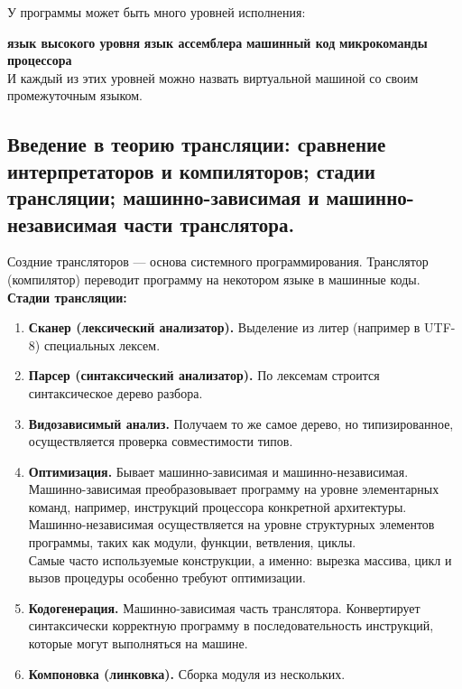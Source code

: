 \documentclass[12pt, a4paper]{article}
\begin{document}
У программы может быть много уровней исполнения:

\textbf{язык высокого уровня} \Longrightarrow{} \textbf{язык ассемблера} \Longrightarrow{} \textbf{машинный код} \Longrightarrow{} \textbf{микрокоманды процессора}\\

И каждый из этих уровней можно назвать виртуальной машиной со своим промежуточным языком. 

\subsection{Введение в теорию трансляции: сравнение интерпретаторов и компиляторов; стадии трансляции; машинно-зависимая и машинно-независимая части транслятора.}

Создние трансляторов --- основа системного программирования. Транслятор (компилятор) переводит программу на некотором языке в машинные коды.\\

\textbf{Стадии трансляции:}

\begin{enumerate}
    \item \textbf{Сканер (лексический анализатор).} Выделение из литер (например в UTF-8) специальных лексем.
    \item \textbf{Парсер (синтаксический анализатор).} По лексемам строится синтаксическое дерево разбора.
    \item \textbf{Видозависимый анализ.} Получаем то же самое дерево, но типизированное, осуществляется проверка совместимости типов.
    \item \textbf{Оптимизация.} Бывает машинно-зависимая и машинно-независимая. Машинно-зависимая преобразовывает программу на уровне элементарных команд, например, инструкций процессора конкретной архитектуры. Машинно-независимая осуществляется на уровне структурных элементов программы, таких как модули, функции, ветвления, циклы.\\
    Самые часто используемые конструкции, а именно: вырезка массива, цикл и вызов процедуры особенно требуют оптимизации. 
    \item \textbf{Кодогенерация.} Машинно-зависимая часть транслятора. Конвертирует синтаксически корректную программу в последовательность инструкций, которые могут выполняться на машине.
    \item \textbf{Компоновка (линковка).} Сборка модуля из нескольких.
\end{enumerate}
\end{document}
